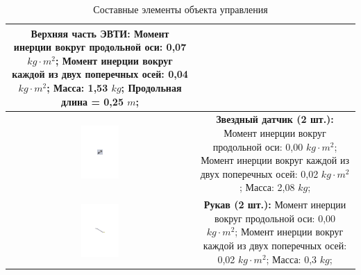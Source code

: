\begin{table}[h!]
\begin{tabular}{|c|c|}
    \shortstack[l]{\textbf{Верхняя часть ЭВТИ:}                                                     \\
                    Момент инерции вокруг продольной оси: 0,07 $kg \cdot m^{2}$;                    \\
                    Момент инерции вокруг каждой из двух поперечных  осей: 0,04 $kg \cdot m^{2}$;   \\
                    Масса: 1,53 $kg$;                                                               \\
                    Продольная длина = 0,25 $m$;
                  }                                                                                         \\
\hline
    \includegraphics[height=20mm, keepaspectratio]{./src/pictures/sattelite_3d_images/star_sensor}          &
    \shortstack[l]{\textbf{Звездный датчик (2 шт.):}                                                \\
                    Момент инерции вокруг продольной оси: 0,00 $kg \cdot m^{2}$;                    \\
                    Момент инерции вокруг каждой из двух поперечных  осей: 0,02 $kg \cdot m^{2}$;   \\
                    Масса: 2,08 $kg$;
                  }                                                                                         \\
\hline
    \includegraphics[height=20mm, keepaspectratio]{./src/pictures/sattelite_3d_images/sleeve}               &
    \shortstack[l]{\textbf{Рукав (2 шт.):}                                                          \\
                    Момент инерции вокруг продольной оси: 0,00 $kg \cdot m^{2}$;                    \\
                    Момент инерции вокруг каждой из двух поперечных  осей: 0,02 $kg \cdot m^{2}$;   \\
                    Масса: 0,3 $kg$;
                  }                                                                                         \\
\hline
\end{tabular}

\caption{Составные элементы объекта управления}
\end{table}

